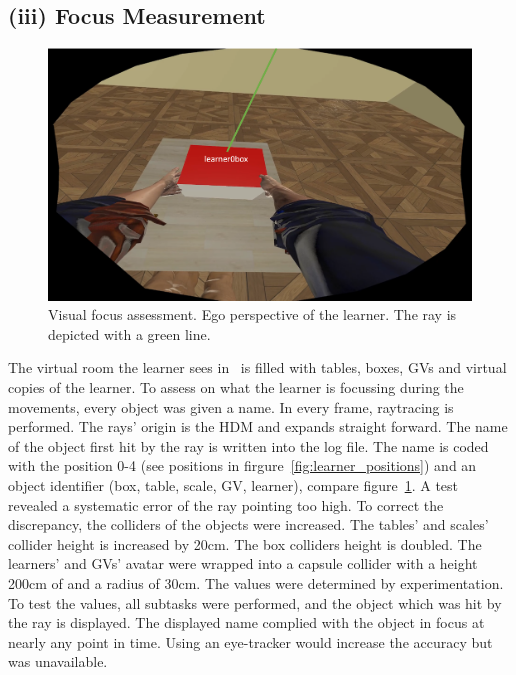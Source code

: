 \subsection{(iii) Focus Measurement}
\label{sec:rayTrace}
\begin{figure}[H]
	\centering
	\includegraphics[width=\textwidth]{figures/focus.png}
	\caption[Focus assessment]{Visual focus assessment. Ego perspective of the learner. The ray is depicted with a green line.}
	\label{fig:focusAssessment}
\end{figure}
The virtual room the learner sees in \exgo\ is filled with tables, boxes, GVs and virtual copies of the learner. To assess on what the learner is focussing during the movements, every object was given a name. In every frame, raytracing is performed. The rays' origin is the HDM and expands straight forward. The name of the object first hit by the ray is written into the log file. The name is coded with the position 0-4 (see positions in firgure~\ref{fig:learner_positions}) and an object identifier (box, table, scale, GV, learner), compare figure~\ref{fig:focusAssessment}. A test revealed a systematic error of the ray pointing too high. To correct the discrepancy, the colliders of the objects were increased. The tables' and scales' collider height is increased by 20cm. The box colliders height is doubled. The learners' and GVs' avatar were wrapped into a capsule collider with a height 200cm of and a radius of 30cm. The values were determined by experimentation. To test the values, all subtasks were performed, and the object which was hit by the ray is displayed. The displayed name complied with the object in focus at nearly any point in time. Using an eye-tracker would increase the accuracy but was unavailable.


